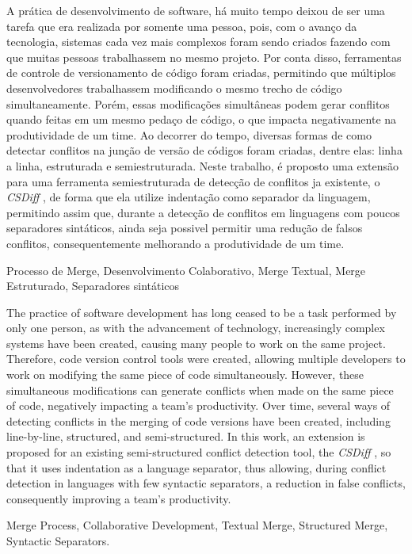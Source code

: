 \resumo
A prática de desenvolvimento de software, há muito tempo deixou de ser uma tarefa
que era realizada por somente uma pessoa, pois, com o avanço da tecnologia, sistemas
cada vez mais complexos foram sendo criados fazendo com que muitas pessoas trabalhassem no
mesmo projeto. Por conta disso, ferramentas de controle de versionamento de
código foram criadas, permitindo que múltiplos desenvolvedores trabalhassem modificando
o mesmo trecho de código simultaneamente. Porém, essas modificações simultâneas
podem gerar conflitos quando feitas em um mesmo pedaço de código, o que impacta
negativamente na produtividade de um time. Ao decorrer do tempo, diversas formas
de como detectar conflitos na junção de versão de códigos foram criadas, dentre
elas: linha a linha, estruturada e semiestruturada. Neste trabalho,
é proposto uma extensão para uma ferramenta semiestruturada de detecção de conflitos
ja existente, o \emph{CSDiff} \cite{clementino2021textual}, de forma que ela
utilize indentação como separador da linguagem, permitindo assim que, durante a
detecção de conflitos em linguagens com poucos separadores sintáticos, ainda seja
possivel permitir uma redução de falsos conflitos, consequentemente melhorando a
produtividade de um time.
\begin{keywords}
	Processo de Merge, Desenvolvimento Colaborativo, Merge Textual, Merge
	Estruturado, Separadores sintáticos
\end{keywords}

\abstract
The practice of software development has long ceased to be a task performed by
only one person, as with the advancement of technology, increasingly complex
systems have been created, causing many people to work on the same project.
Therefore, code version control tools were created, allowing multiple developers
to work on modifying the same piece of code simultaneously. However, these simultaneous
modifications can generate conflicts when made on the same piece of code, negatively
impacting a team's productivity. Over time, several ways of detecting conflicts
in the merging of code versions have been created, including line-by-line, structured,
and semi-structured. In this work, an extension is proposed for an existing
semi-structured conflict detection tool, the \emph{CSDiff} \cite{clementino2021textual},
so that it uses indentation as a language separator, thus allowing, during
conflict detection in languages with few syntactic separators, a reduction in
false conflicts, consequently improving a team's productivity.
\begin{keywords}
	Merge Process, Collaborative Development, Textual Merge, Structured Merge, Syntactic Separators.
\end{keywords}

